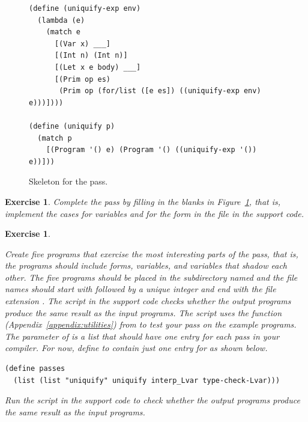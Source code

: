 \documentclass[7x10]{TimesAPriori_MIT}%
\newtheorem{exercise}[theorem]{Exercise}
\begin{document}
{\begin{figure}[tbp]
\begin{lstlisting}
(define (uniquify-exp env)
  (lambda (e)
    (match e
      [(Var x) ___]
      [(Int n) (Int n)]
      [(Let x e body) ___]
      [(Prim op es)
       (Prim op (for/list ([e es]) ((uniquify-exp env) e)))])))

(define (uniquify p)
  (match p
    [(Program '() e) (Program '() ((uniquify-exp '()) e))]))
\end{lstlisting}
\caption{Skeleton for the  pass.}
\label{fig:uniquify-Lvar}
\end{figure}

\begin{exercise}
\normalfont %

Complete the  pass by filling in the blanks in
Figure~\ref{fig:uniquify-Lvar}, that is, implement the cases for
variables and for the  form in the file 
in the support code.
\end{exercise}

\begin{exercise}
\normalfont %
\label{ex:Lvar}

Create five \LangVar{} programs that exercise the most interesting
parts of the  pass, that is, the programs should include
 forms, variables, and variables that shadow each other.
The five programs should be placed in the subdirectory named
 and the file names should start with 
followed by a unique integer and end with the file extension
.
%
The  script in the support code checks whether the
output programs produce the same result as the input programs.  The
script uses the  function
(Appendix~\ref{appendix:utilities}) from  to test
your  pass on the example programs.  The 
parameter of  is a list that should have one entry
for each pass in your compiler.  For now, define  to
contain just one entry for  as shown below.
\begin{lstlisting}
(define passes 
  (list (list "uniquify" uniquify interp_Lvar type-check-Lvar)))
\end{lstlisting}
Run the  script in the support code to check
whether the output programs produce the same result as the input
programs.
\end{exercise}

\fi}
\end{document}
